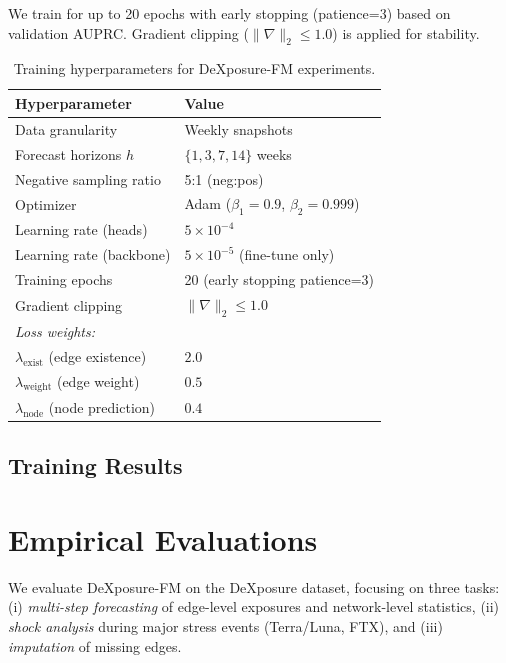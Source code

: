 \documentclass[preprint,12pt]{elsarticle}
\renewcommand{\paragraph}[1]{}
\begin{document}
\paragraph{Training details.}
We train for up to 20 epochs with early stopping (patience=3) based on validation AUPRC. Gradient clipping ($\|\nabla\|_2 \le 1.0$) is applied for stability.

\begin{table}[t]
\centering
\small
\setlength{\tabcolsep}{6pt}
\renewcommand{\arraystretch}{1.05}
\begin{tabular}{ll}
\hline
\textbf{Hyperparameter} & \textbf{Value} \\
\hline
Data granularity & Weekly snapshots \\
Forecast horizons $h$ & $\{1, 3, 7, 14\}$ weeks \\
Negative sampling ratio & 5:1 (neg:pos) \\
Optimizer & Adam ($\beta_1=0.9$, $\beta_2=0.999$) \\
Learning rate (heads) & $5 \times 10^{-4}$ \\
Learning rate (backbone) & $5 \times 10^{-5}$ (fine-tune only) \\
Training epochs & 20 (early stopping patience=3) \\
Gradient clipping & $\|\nabla\|_2 \le 1.0$ \\
\hline
\multicolumn{2}{l}{\textit{Loss weights:}} \\
$\lambda_{\mathrm{exist}}$ (edge existence) & $2.0$ \\
$\lambda_{\mathrm{weight}}$ (edge weight) & $0.5$ \\
$\lambda_{\mathrm{node}}$ (node prediction) & $0.4$ \\
\hline
\end{tabular}
\caption{Training hyperparameters for DeXposure-FM experiments.}
\label{tab:training-hparams}
\end{table}

\subsection{Training Results} \section{Empirical Evaluations}
\label{sec:evaluation}

We evaluate DeXposure-FM on the DeXposure dataset, focusing on three tasks: (i) \textit{multi-step forecasting} of edge-level exposures and network-level statistics, (ii) \textit{shock analysis} during major stress events (Terra/Luna, FTX), and (iii) \textit{imputation} of missing edges.
\end{document}
